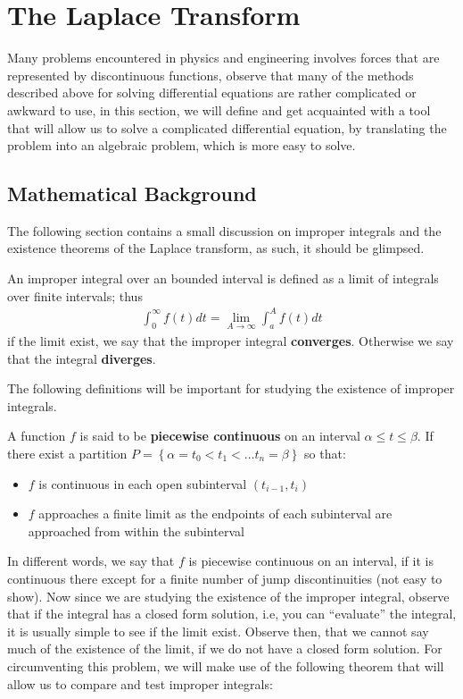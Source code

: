 \section{The Laplace Transform}
Many problems encountered in physics and engineering involves forces that are represented by discontinuous functions, observe that many of the methods described above for solving differential equations are rather complicated or awkward to use, in this section, we will define and get acquainted with a tool that will allow us to solve a complicated differential equation, by translating the problem into an algebraic problem, which is more easy to solve.
\subsection{Mathematical Background}
The following section contains a small discussion on improper integrals and the existence theorems of the Laplace transform, as such, it should be glimpsed.
\begin{define}
	An improper integral over an bounded interval is defined as a limit of integrals over finite intervals; thus
	\begin{align*}
	\int_0^\infty f(t) dt = \lim_{A \rightarrow \infty} \int_a^{A} f(t) dt
	\end{align*}
	if the limit exist, we say that the improper integral \textbf{converges}. Otherwise we say that the integral \textbf{diverges}.
\end{define}
The following definitions will be important for studying the existence of improper integrals.
\begin{define}
	A function $f$ is said to be \textbf{piecewise continuous} on an interval $ \alpha \leq t \leq \beta $. If there exist a partition $P = \left\lbrace \alpha = t_0 < t_1 < \ldots t_n = \beta \right\rbrace $ so that:
	\begin{itemize}
		\item $f$ is continuous in each open subinterval $(t_{i-1},t_i)$
		\item $f$ approaches a finite limit as the endpoints of each subinterval are approached from within the subinterval
	\end{itemize}
\end{define}
In different words, we say that $f$ is piecewise continuous on an interval, if it is continuous there except for a finite number of jump discontinuities (not easy to show). 
Now since we are studying the existence of the improper integral, observe that if the integral has a closed form solution, i.e, you can ``evaluate'' the integral, it is usually simple to see if the limit exist. Observe then, that we cannot say much of the existence of the limit, if we do not have a closed form solution. For circumventing this problem, we will make use of the following theorem that will allow us to compare and test improper integrals:
